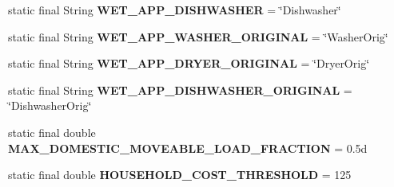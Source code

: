 \begin{DoxyCompactItemize}
\item 
\hypertarget{classuk_1_1ac_1_1dmu_1_1iesd_1_1cascade_1_1base_1_1_consts_a4f25b0fd55e678cfa845c7ce99adbfc6}{static final String {\bfseries W\-E\-T\-\_\-\-A\-P\-P\-\_\-\-D\-I\-S\-H\-W\-A\-S\-H\-E\-R} = \char`\"{}Dishwasher\char`\"{}}\label{classuk_1_1ac_1_1dmu_1_1iesd_1_1cascade_1_1base_1_1_consts_a4f25b0fd55e678cfa845c7ce99adbfc6}

\item 
\hypertarget{classuk_1_1ac_1_1dmu_1_1iesd_1_1cascade_1_1base_1_1_consts_a63b847dfeb45f1a052b5b3c59e6d077e}{static final String {\bfseries W\-E\-T\-\_\-\-A\-P\-P\-\_\-\-W\-A\-S\-H\-E\-R\-\_\-\-O\-R\-I\-G\-I\-N\-A\-L} = \char`\"{}Washer\-Orig\char`\"{}}\label{classuk_1_1ac_1_1dmu_1_1iesd_1_1cascade_1_1base_1_1_consts_a63b847dfeb45f1a052b5b3c59e6d077e}

\item 
\hypertarget{classuk_1_1ac_1_1dmu_1_1iesd_1_1cascade_1_1base_1_1_consts_a6d1e1e5dc2d734ff12a22b1a34f5e3b4}{static final String {\bfseries W\-E\-T\-\_\-\-A\-P\-P\-\_\-\-D\-R\-Y\-E\-R\-\_\-\-O\-R\-I\-G\-I\-N\-A\-L} = \char`\"{}Dryer\-Orig\char`\"{}}\label{classuk_1_1ac_1_1dmu_1_1iesd_1_1cascade_1_1base_1_1_consts_a6d1e1e5dc2d734ff12a22b1a34f5e3b4}

\item 
\hypertarget{classuk_1_1ac_1_1dmu_1_1iesd_1_1cascade_1_1base_1_1_consts_ab0cfad2e0ae8673bae927013911ce459}{static final String {\bfseries W\-E\-T\-\_\-\-A\-P\-P\-\_\-\-D\-I\-S\-H\-W\-A\-S\-H\-E\-R\-\_\-\-O\-R\-I\-G\-I\-N\-A\-L} = \char`\"{}Dishwasher\-Orig\char`\"{}}\label{classuk_1_1ac_1_1dmu_1_1iesd_1_1cascade_1_1base_1_1_consts_ab0cfad2e0ae8673bae927013911ce459}

\item 
\hypertarget{classuk_1_1ac_1_1dmu_1_1iesd_1_1cascade_1_1base_1_1_consts_aca2050cd46ac4996a3ed9fc6d0f545ae}{static final double {\bfseries M\-A\-X\-\_\-\-D\-O\-M\-E\-S\-T\-I\-C\-\_\-\-M\-O\-V\-E\-A\-B\-L\-E\-\_\-\-L\-O\-A\-D\-\_\-\-F\-R\-A\-C\-T\-I\-O\-N} = 0.\-5d}\label{classuk_1_1ac_1_1dmu_1_1iesd_1_1cascade_1_1base_1_1_consts_aca2050cd46ac4996a3ed9fc6d0f545ae}

\item 
\hypertarget{classuk_1_1ac_1_1dmu_1_1iesd_1_1cascade_1_1base_1_1_consts_afe5db104dbae01aa817d553011b8cad4}{static final double {\bfseries H\-O\-U\-S\-E\-H\-O\-L\-D\-\_\-\-C\-O\-S\-T\-\_\-\-T\-H\-R\-E\-S\-H\-O\-L\-D} = 125}\label{classuk_1_1ac_1_1dmu_1_1iesd_1_1cascade_1_1base_1_1_consts_afe5db104dbae01aa817d553011b8cad4}


\end{DoxyCompactItemize}
